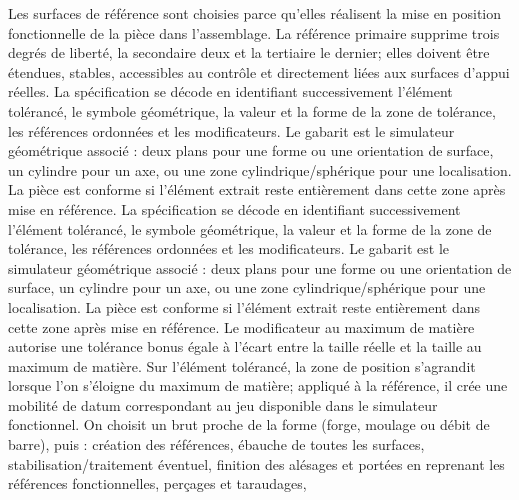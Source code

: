 \begin{corrigebox}
Les surfaces de référence sont choisies parce qu'elles
                réalisent la mise en position fonctionnelle de la pièce dans l'assemblage.
                La référence primaire supprime trois degrés de liberté, la secondaire deux
                et la tertiaire le dernier; elles doivent être étendues, stables,
                accessibles au contrôle et directement liées aux surfaces d'appui réelles.
La spécification se décode en identifiant successivement
                l'élément tolérancé, le symbole géométrique, la valeur et la forme de la
                zone de tolérance, les références ordonnées et les modificateurs. Le
                gabarit est le simulateur géométrique associé : deux plans pour une forme
                ou une orientation de surface, un cylindre pour un axe, ou une zone
                cylindrique/sphérique pour une localisation. La pièce est conforme si
                l'élément extrait reste entièrement dans cette zone après mise en référence.
La spécification se décode en identifiant successivement
                l'élément tolérancé, le symbole géométrique, la valeur et la forme de la
                zone de tolérance, les références ordonnées et les modificateurs. Le
                gabarit est le simulateur géométrique associé : deux plans pour une forme
                ou une orientation de surface, un cylindre pour un axe, ou une zone
                cylindrique/sphérique pour une localisation. La pièce est conforme si
                l'élément extrait reste entièrement dans cette zone après mise en référence.
Le modificateur au maximum de matière autorise une
                tolérance bonus égale à l'écart entre la taille réelle et la taille au
                maximum de matière. Sur l'élément tolérancé, la zone de position s'agrandit
                lorsque l'on s'éloigne du maximum de matière; appliqué à la référence, il
                crée une mobilité de datum correspondant au jeu disponible dans le
                simulateur fonctionnel.
On choisit un brut proche de la forme (forge, moulage ou
                débit de barre), puis : création des références, ébauche de toutes les
                surfaces, stabilisation/traitement éventuel, finition des alésages et
                portées en reprenant les références fonctionnelles, perçages et taraudages,

\end{corrigebox}
